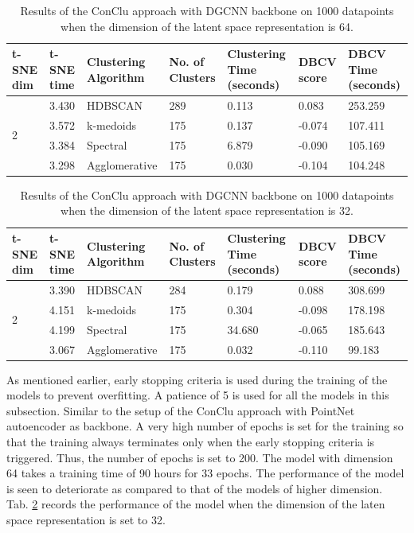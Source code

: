 \begin{table}[H]
  \setlength\extrarowheight{10pt}
  \caption{Results of the ConClu approach with \ac{DGCNN} backbone on 1000 datapoints when the dimension of the latent space representation is 64. }
  \centering
  \begin{tabular}{|p{30pt}|p{50pt}|p{60pt}|p{50pt}|p{50pt}|p{50pt}|p{40pt}|}
    \toprule
    \ac{t-SNE} dim	& \ac{t-SNE} time & Clustering Algorithm & No. of Clusters & Clustering Time (seconds) & \ac{DBCV} score & \ac{DBCV} Time (seconds)\\
    \midrule
    \multirow{4}{30pt}{2}	& 3.430	& \ac{HDBSCAN}	& 289	& 0.113	& 0.083	& 253.259 \\ \cline{2-7} 
    & 3.572	& k-medoids	& 175	& 0.137	& -0.074	& 107.411 \\ \cline{2-7} 
    & 3.384	& Spectral	& 175	& 6.879	& -0.090	& 105.169 \\ \cline{2-7}
    & 3.298	& Agglomerative	& 175	& 0.030	& -0.104	& 104.248 \\ 
    \bottomrule
  \end{tabular}
  \label{tab:dgcnn_64}
\end{table}

\begin{table}[H]
  \setlength\extrarowheight{10pt}
  \caption{Results of the ConClu approach with \ac{DGCNN} backbone on 1000 datapoints when the dimension of the latent space representation is 32. }
  \centering
  \begin{tabular}{|p{30pt}|p{50pt}|p{60pt}|p{50pt}|p{50pt}|p{50pt}|p{40pt}|}
    \toprule
    \ac{t-SNE} dim	& \ac{t-SNE} time & Clustering Algorithm & No. of Clusters & Clustering Time (seconds) & \ac{DBCV} score & \ac{DBCV} Time (seconds)\\
    \midrule
    \multirow{4}{30pt}{2}	& 3.390	& \ac{HDBSCAN}	& 284	& 0.179	& 0.088	& 308.699 \\ \cline{2-7} 
    & 4.151	& k-medoids	& 175	& 0.304	& -0.098	& 178.198 \\ \cline{2-7} 
    & 4.199	& Spectral	& 175	& 34.680	& -0.065	& 185.643 \\ \cline{2-7}
    & 3.067	& Agglomerative	& 175	& 0.032	& -0.110	& 99.183 \\ 
    \bottomrule
  \end{tabular}
  \label{tab:dgcnn_32}
\end{table} 

As mentioned earlier, early stopping criteria is used during the training of the models to prevent overfitting. A patience of 5 is used for all the models in this subsection. Similar to the setup of the ConClu approach with PointNet autoencoder as backbone. A very high number of epochs is set for the training so that the training always terminates only when the early stopping criteria is triggered. Thus, the number of epochs is set to 200. The model with dimension 64 takes a training time of 90 hours for 33 epochs. The performance of the model is seen to deteriorate as compared to that of the models of higher dimension. Tab. \ref{tab:dgcnn_32} records the performance of the model when the dimension of the laten space representation is set to 32. 

